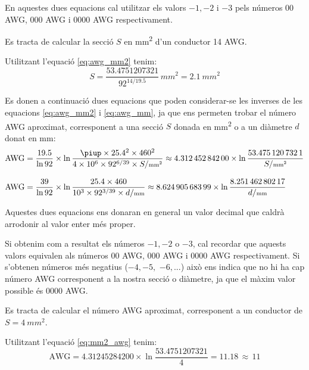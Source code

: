En aquestes dues equacions cal utilitzar els valors $-1, -2$ i $-3$  pels números 00 AWG,
000 AWG i 0000 AWG respectivament.


\begin{exemple}\label{ex:AWGammSQ}
	\addcontentsxms{\AWGammSQ}
    Es tracta de calcular la secció $S$ en \unit{mm^2} d'un conductor 14 AWG.

    Utilitzant l'equació \eqref{eq:awg_mm2} tenim:
    \[
        S = \dfrac{\num{53,4751207321}}{92^{14/\num{19,5}}} 
        \,\unit{mm^2} = \qty{2,1}{mm^2}
    \]
\end{exemple}


Es donen a continuació dues equacions que poden considerar-se les inverses de les equacions \eqref{eq:awg_mm2} i \eqref{eq:awg_mm}, ja que ens permeten trobar el número AWG aproximat, corresponent a una secció $S$ donada en \unit{mm^2} o a un diàmetre $d$ donat en \unit{mm}:
\begin{align}
   \text{AWG} &= \frac{\num{19,5}}{\ln 92} \times \ln \frac{\piup \times
   \num{25,4}^2 \times 460^2}{4 \times 10^6 \times 92^{6/39} \times S/{\scriptstyle\unit{mm^2}}} \approx
   \num{4,31245284200} \times \ln \frac{\num{53,4751207321}}{S/{\scriptstyle\unit{mm^2}}}\label{eq:mm2_awg} \\[2ex]
   \text{AWG} &= \frac{39}{\ln 92} \times \ln \frac{\num{25,4} \times 460}{10^3 \times 92^{3/39} \times d/{\scriptstyle\unit{mm}}} \approx
   \num{8,62490568399} \times \ln \frac{\num{8,25146280217}}{d/{\scriptstyle\unit{mm}}}\label{eq:mm_awg}
\end{align}

Aquestes dues equacions ens donaran en general un valor decimal que caldrà arrodonir al valor enter  més proper.

Si obtenim com a resultat els números $-1, -2$ o $-3$, cal recordar que aquests valors equivalen als números 00 AWG,
000 AWG i 0000 AWG respectivament. Si s'obtenen números més negatius ($-4, -5,$ $-6, ...$) això ens indica que no hi ha cap número AWG corresponent a la nostra secció o diàmetre, ja que el màxim valor possible és 0000 AWG.



\begin{exemple}\label{ex:mmSQaAWG}
	\addcontentsxms{\mmSQaAWG}
    Es tracta de calcular el número AWG aproximat, corresponent a un conductor de $S=\qty{4}{mm^2}$.

    Utilitzant l'equació \eqref{eq:mm2_awg} tenim:
    \[
        \text{AWG} = \num{4,31245284200} \times \ln \dfrac{\num{53,4751207321}}{4} =
        \num{11,18} \, \approx \, 11
    \]
\end{exemple}

